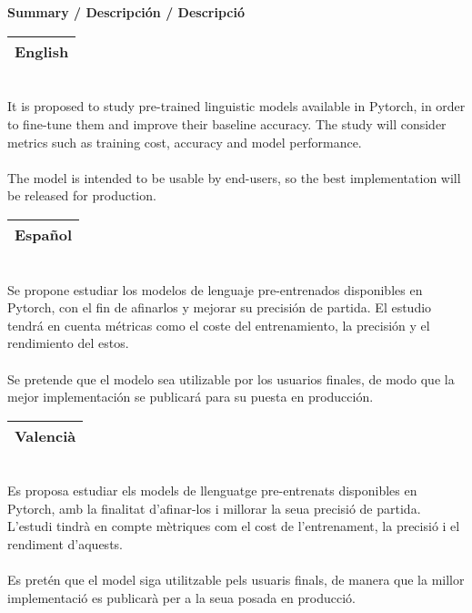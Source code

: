 \documentclass[12pt]{article}
\begin{document}
    ~\\\\
    \textbf{\large Summary / Descripción / Descripció}
    \begin{table}[hbt!]
        \centering
        \begin{tabular}{|
        >{\columncolor[HTML]{ECECEC}}l |}
        \hline
        English  \\ \hline
        \end{tabular}
    \end{table}
    \\It is proposed to study pre-trained linguistic models available in Pytorch, in order to fine-tune them and improve their baseline accuracy. 
    The study will consider metrics such as training cost, accuracy and model performance.
    \\\\The model is intended to be usable by end-users, so the best implementation will be released for production.
    \begin{table}[hbt!]
        \centering
        \begin{tabular}{|
        >{\columncolor[HTML]{ECECEC}}l |}
        \hline
        Español  \\ \hline
        \end{tabular}
    \end{table}
~\\Se propone estudiar los modelos de lenguaje pre-entrenados disponibles en Pytorch, con el fin de afinarlos y mejorar su precisión de partida.  El estudio tendrá en cuenta métricas como el coste del entrenamiento, la precisión y el rendimiento del estos.
\\\\Se pretende que el modelo sea utilizable por los usuarios finales, de modo que la mejor implementación se publicará para su puesta en producción.

\newpage
    \begin{table}[hbt!]
        \centering
        \begin{tabular}{|
        >{\columncolor[HTML]{ECECEC}}l |}
        \hline
        Valencià  \\ \hline
        \end{tabular}
    \end{table}
    ~\\Es proposa estudiar els models de llenguatge pre-entrenats disponibles en Pytorch, amb la finalitat d'afinar-los i millorar la seua precisió de partida. L'estudi tindrà en compte mètriques com el cost de l'entrenament, la precisió i el rendiment d'aquests.
    \\\\Es pretén que el model siga utilitzable pels usuaris finals, de manera que la millor implementació es publicarà per a la seua posada en producció.
\end{document}

